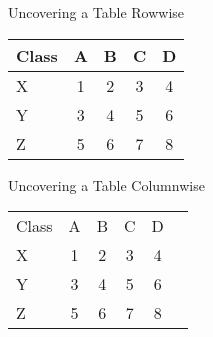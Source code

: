 \documentclass{beamer}
\begin{document}
 
\begin{frame}
Uncovering a Table Rowwise \newline
\begin{tabular}{l!{\vrule}cccc}
  Class & A & B & C & D \\\hline
  X     & 1 & 2 & 3 & 4 \pause\\
  Y     & 3 & 4 & 5 & 6 \pause\\
  Z     &5&6&7&8
\end{tabular}
\end{frame}
 
\begin{frame}
Uncovering a Table Columnwise \newline
\begin{tabular}{l!{\vrule}c<{}c<{}c<{}c<{\onslide}c}
  Class & A & B & C & D \\
  X     & 1 & 2 & 3 & 4 \\
  Y     & 3 & 4 & 5 & 6 \\
  Z     &5&6&7&8
\end{tabular}
\end{frame}
\end{document}
